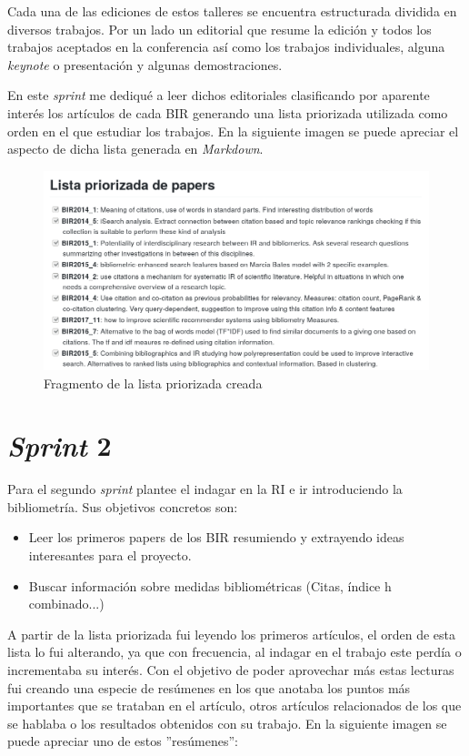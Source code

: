 Cada una de las ediciones de estos talleres se encuentra estructurada dividida en diversos trabajos. Por un lado un editorial que resume la edición y todos los trabajos aceptados en la conferencia así como los trabajos individuales, alguna \textit{keynote} o presentación y algunas demostraciones. 

En este \textit{sprint} me dediqué a leer dichos editoriales clasificando por aparente interés los artículos de cada \acrshort{BIR} generando una lista priorizada utilizada como orden en el que estudiar los trabajos. En la siguiente imagen se puede apreciar el aspecto de dicha lista generada en \textit{Markdown}.

\begin{figure}[ht]
	
	\centering
	\includegraphics[width=\linewidth]{imagenes/lista_priorizada}
	\caption{Fragmento de la lista priorizada creada}
\end{figure}

\section{\textit{Sprint} 2}
Para el segundo \textit{sprint} plantee el indagar en la \acrshort{RI} e ir introduciendo la bibliometría. Sus objetivos concretos son: 

\begin{itemize}
	\item Leer los primeros papers de los \acrshort{BIR} resumiendo y extrayendo ideas interesantes para el proyecto.
	\item Buscar información sobre medidas bibliométricas (Citas, índice h combinado...)
\end{itemize}

A partir de la lista priorizada fui leyendo los primeros artículos, el orden de esta lista lo fui alterando, ya que con frecuencia, al indagar en el trabajo este perdía o incrementaba su interés. Con el objetivo de poder aprovechar más estas lecturas fui creando una especie de resúmenes en los que anotaba los puntos más importantes que se trataban en el artículo, otros artículos relacionados de los que se hablaba o los resultados obtenidos con su trabajo. En la siguiente imagen se puede apreciar uno de estos ''resúmenes'':

